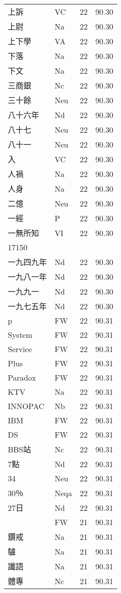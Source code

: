 \documentclass[twocolumn]{book}
\begin{document}
\begin{supertabular}{llrr}
上訴 & VC & 22 &  90.30\\
上尉 & Na & 22 &  90.30\\
上下學 & VA & 22 &  90.30\\
下落 & Na & 22 &  90.30\\
下文 & Na & 22 &  90.30\\
三商銀 & Nc & 22 &  90.30\\
三十餘 & Neu & 22 &  90.30\\
八十六年 & Nd & 22 &  90.30\\
八十七 & Neu & 22 &  90.30\\
八十一 & Neu & 22 &  90.30\\
入 & VC & 22 &  90.30\\
人禍 & Na & 22 &  90.30\\
人身 & Na & 22 &  90.30\\
二億 & Neu & 22 &  90.30\\
一經 & P & 22 &  90.30\\
一無所知 & VI & 22 &  90.30\\
17150\\
一九四九年 & Nd & 22 &  90.30\\
一九八一年 & Nd & 22 &  90.30\\
一九九一 & Nd & 22 &  90.30\\
一九七五年 & Nd & 22 &  90.30\\
p & FW & 22 &  90.31\\
System & FW & 22 &  90.31\\
Service & FW & 22 &  90.31\\
Plus & FW & 22 &  90.31\\
Paradox & FW & 22 &  90.31\\
KTV & Na & 22 &  90.31\\
INNOPAC & Nb & 22 &  90.31\\
IBM & FW & 22 &  90.31\\
DS & FW & 22 &  90.31\\
BBS站 & Nc & 22 &  90.31\\
7點 & Nd & 22 &  90.31\\
34 & Neu & 22 &  90.31\\
30％ & Neqa & 22 &  90.31\\
27日 & Nd & 22 &  90.31\\
 & FW & 21 &  90.31\\
鑽戒 & Na & 21 &  90.31\\
驢 & Na & 21 &  90.31\\
讖語 & Na & 21 &  90.31\\
體專 & Nc & 21 &  90.31\\

\end{supertabular}
\end{document}

